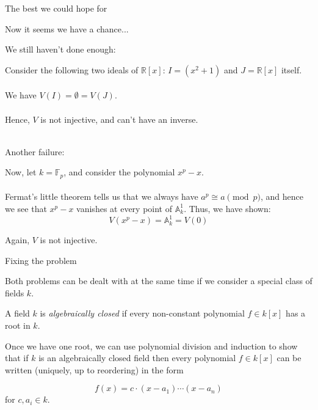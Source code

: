\documentclass{beamer}
\newcommand{\AAA}{\mathbb{A}}
\newcommand{\R}{\mathbb{R}}
\begin{document}
\begin{frame}{The best we could hope for}


\begin{center}
\end{center}

Now it seems we have a chance...

\end{frame}

\begin{frame}{We still haven't done enough:}

Consider the following two ideals of $\R[x]$: $I=(x^2+1)$ and $J=\R[x]$ itself. \\~\\

We have $V(I)=\emptyset=V(J)$. \\~\\

Hence, $V$ is not injective, and can't have an inverse. \\~\\

\end{frame}


\begin{frame}{Another failure:}

Now, let $k=\mathbb{F}_p$, and consider the polynomial $x^p-x$. \\~\\

 Fermat's little theorem tells us that we always have $a^p\cong a\pmod p$, and hence we see that $x^p-x$ vanishes at every point of $\AAA_k^1$.  Thus, we have shown:
$$V(x^p-x)=\AAA^1_k=V(0)$$

Again, $V$ is not injective.
\end{frame}

\begin{frame}{Fixing the problem}

Both problems can be dealt with at the same time if we consider a special class of fields $k$.

\begin{definition} A field $k$ is \emph{algebraically closed} if every non-constant polynomial $f\in k[x]$ has a root in $k$.
\end{definition}

Once we have one root, we can use polynomial division and induction to show that if $k$ is an algebraically closed field then every polynomial $f\in k[x]$ can be written (uniquely, up to reordering) in the form

$$f(x)=c\cdot (x-a_1)\cdots (x-a_n)$$
for $c, a_i\in k$.


\end{frame}
\end{document}
